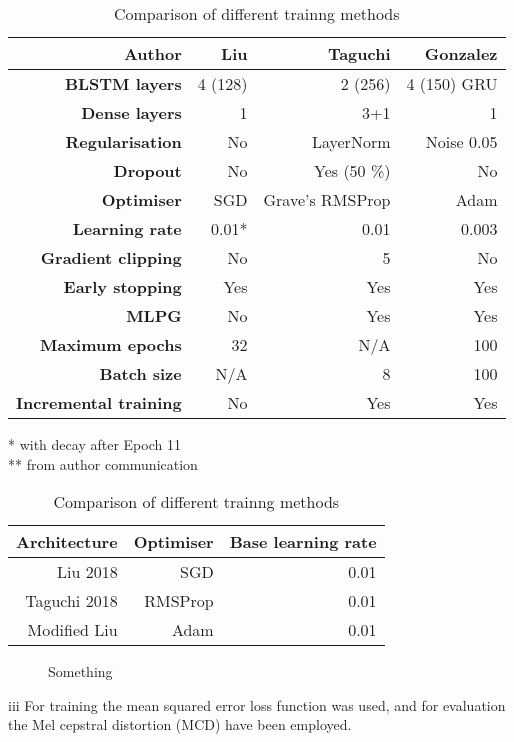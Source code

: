 \documentclass[a4paper]{article}
\begin{document}
\begin{table}[th]
  \caption{Comparison of different trainng methods}
  \label{tab:example}
  \centering
  \footnotesize

  \begin{tabular}{ r r r r }
    \toprule
    \textbf{Author} & \textbf{Liu} & \textbf{Taguchi} & \textbf{Gonzalez} \\
    \midrule
    \textbf{BLSTM layers} & 4 (128) & 2 (256) & 4 (150) GRU \\
    \textbf{Dense layers} & 1 & 3+1 & 1 \\
    \textbf{Regularisation} & No & LayerNorm & Noise 0.05 \\
    \textbf{Dropout} & No & Yes (50 \%) & No \\
    \textbf{Optimiser} & SGD & Grave's RMSProp & Adam \\
    \textbf{Learning rate} & 0.01* & 0.01 & 0.003 \\
    \textbf{Gradient clipping} & No & 5 & No \\
    \textbf{Early stopping} & Yes & Yes & Yes \\
    \textbf{MLPG} & No & Yes & Yes \\ 
    \textbf{Maximum epochs} & 32 & N/A & 100 \\
    \textbf{Batch size} & N/A & 8 & 100 \\
    \textbf{Incremental training} & No & Yes & Yes \\
    \bottomrule
  \end{tabular}
  * with decay after Epoch 11 \\
  ** from author communication
\end{table}
\begin{table}[th]
  \caption{Comparison of different trainng methods}
  \label{tab:example}
  \centering
  \begin{tabular}{ r r r }
    \toprule
    \textbf{Architecture} & \textbf{Optimiser} & \textbf{Base learning rate} \\
    \midrule
    Liu 2018 & SGD & 0.01 \\
    Taguchi 2018 & RMSProp & 0.01       \\
    Modified Liu & Adam & 0.01               \\
    \bottomrule
  \end{tabular}
  
\end{table}

\begin{figure}[t]
  \begin{center}
    \scalebox{0.75}{}
    \caption{Something}
\end{center}
\end{figure}
iii
For training the mean squared error loss function was used, and for
evaluation the Mel cepstral distortion (MCD) have been employed. \cite{Kubichek1993}
\end{document}
